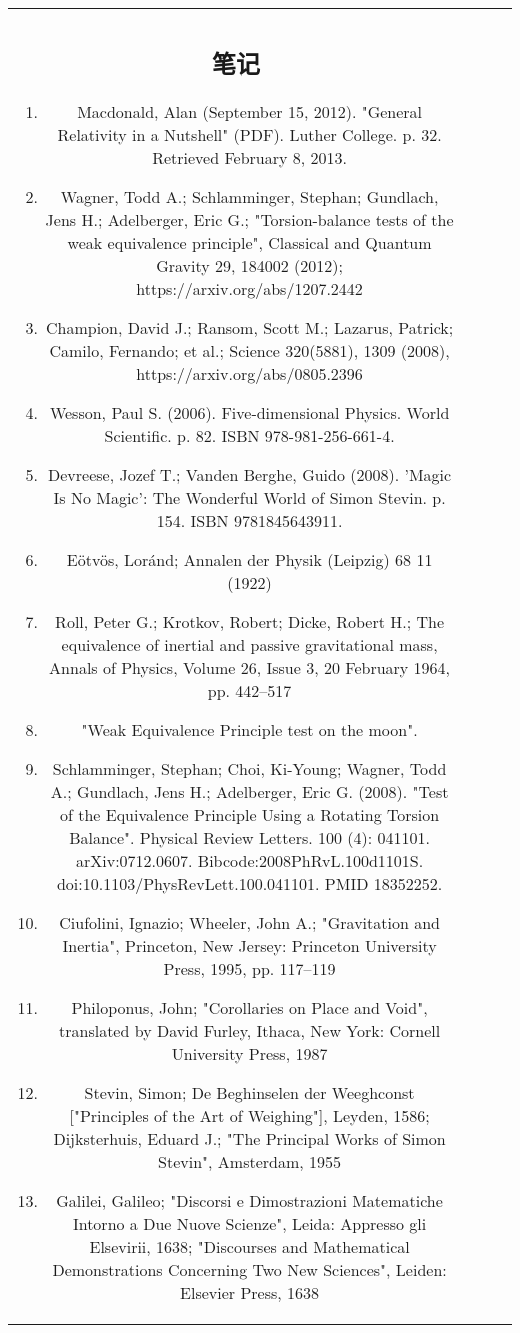 \begin{table}[ht]
\begin{tabular}{|c|c|c|c}
\subsection{笔记}

\begin{enumerate}
\item Macdonald, Alan (September 15, 2012). "General Relativity in a Nutshell" (PDF). Luther College. p. 32. Retrieved February 8, 2013.
\item Wagner, Todd A.; Schlamminger, Stephan; Gundlach, Jens H.; Adelberger, Eric G.; "Torsion-balance tests of the weak equivalence principle", Classical and Quantum Gravity 29, 184002 (2012); https://arxiv.org/abs/1207.2442
\item Champion, David J.; Ransom, Scott M.; Lazarus, Patrick; Camilo, Fernando; et al.; Science 320(5881), 1309 (2008), https://arxiv.org/abs/0805.2396
\item Wesson, Paul S. (2006). Five-dimensional Physics. World Scientific. p. 82. ISBN 978-981-256-661-4.
\item Devreese, Jozef T.; Vanden Berghe, Guido (2008). 'Magic Is No Magic': The Wonderful World of Simon Stevin. p. 154. ISBN 9781845643911.
\item Eötvös, Loránd; Annalen der Physik (Leipzig) 68 11 (1922)
\item Roll, Peter G.; Krotkov, Robert; Dicke, Robert H.; The equivalence of inertial and passive gravitational mass, Annals of Physics, Volume 26, Issue 3, 20 February 1964, pp. 442–517
\item "Weak Equivalence Principle test on the moon".
\item Schlamminger, Stephan; Choi, Ki-Young; Wagner, Todd A.; Gundlach, Jens H.; Adelberger, Eric G. (2008). "Test of the Equivalence Principle Using a Rotating Torsion Balance". Physical Review Letters. 100 (4): 041101. arXiv:0712.0607. Bibcode:2008PhRvL.100d1101S. doi:10.1103/PhysRevLett.100.041101. PMID 18352252.
\item Ciufolini, Ignazio; Wheeler, John A.; "Gravitation and Inertia", Princeton, New Jersey: Princeton University Press, 1995, pp. 117–119
\item Philoponus, John; "Corollaries on Place and Void", translated by David Furley, Ithaca, New York: Cornell University Press, 1987
\item Stevin, Simon; De Beghinselen der Weeghconst ["Principles of the Art of Weighing"], Leyden, 1586; Dijksterhuis, Eduard J.; "The Principal Works of Simon Stevin", Amsterdam, 1955
\item Galilei, Galileo; "Discorsi e Dimostrazioni Matematiche Intorno a Due Nuove Scienze", Leida: Appresso gli Elsevirii, 1638; "Discourses and Mathematical Demonstrations Concerning Two New Sciences", Leiden: Elsevier Press, 1638

\end{enumerate}
\end{tabular}
\end{table}
